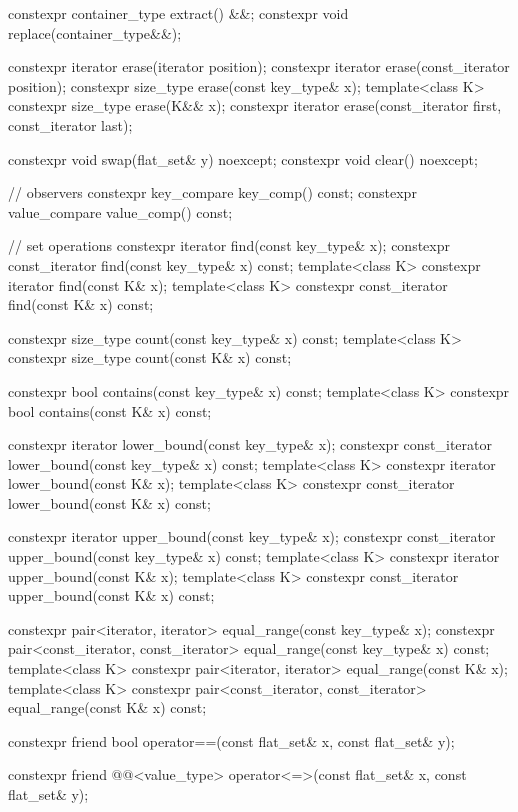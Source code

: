 \begin{codeblock}
{{    constexpr container_type extract() &&;
    constexpr void replace(container_type&&);

    constexpr iterator erase(iterator position);
    constexpr iterator erase(const_iterator position);
    constexpr size_type erase(const key_type& x);
    template<class K> constexpr size_type erase(K&& x);
    constexpr iterator erase(const_iterator first, const_iterator last);

    constexpr void swap(flat_set& y) noexcept;
    constexpr void clear() noexcept;

    // observers
    constexpr key_compare key_comp() const;
    constexpr value_compare value_comp() const;

    // set operations
    constexpr iterator find(const key_type& x);
    constexpr const_iterator find(const key_type& x) const;
    template<class K> constexpr iterator find(const K& x);
    template<class K> constexpr const_iterator find(const K& x) const;

    constexpr size_type count(const key_type& x) const;
    template<class K> constexpr size_type count(const K& x) const;

    constexpr bool contains(const key_type& x) const;
    template<class K> constexpr bool contains(const K& x) const;

    constexpr iterator lower_bound(const key_type& x);
    constexpr const_iterator lower_bound(const key_type& x) const;
    template<class K> constexpr iterator lower_bound(const K& x);
    template<class K> constexpr const_iterator lower_bound(const K& x) const;

    constexpr iterator upper_bound(const key_type& x);
    constexpr const_iterator upper_bound(const key_type& x) const;
    template<class K> constexpr iterator upper_bound(const K& x);
    template<class K> constexpr const_iterator upper_bound(const K& x) const;

    constexpr pair<iterator, iterator> equal_range(const key_type& x);
    constexpr pair<const_iterator, const_iterator> equal_range(const key_type& x) const;
    template<class K>
      constexpr pair<iterator, iterator> equal_range(const K& x);
    template<class K>
      constexpr pair<const_iterator, const_iterator> equal_range(const K& x) const;

    constexpr friend bool operator==(const flat_set& x, const flat_set& y);

    constexpr friend @@<value_type>
      operator<=>(const flat_set& x, const flat_set& y);

}}
\end{codeblock}
